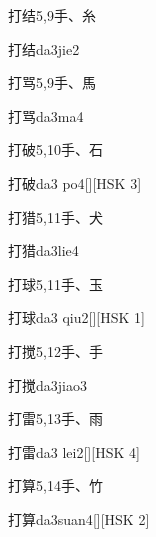 \begin{entry}{打结}{5,9}{⼿、⽷}
  \begin{phonetics}{打结}{da3jie2}
  \end{phonetics}
\end{entry}

\begin{entry}{打骂}{5,9}{⼿、⾺}
  \begin{phonetics}{打骂}{da3ma4}
  \end{phonetics}
\end{entry}

\begin{entry}{打破}{5,10}{⼿、⽯}
  \begin{phonetics}{打破}{da3 po4}[][HSK 3]
  \end{phonetics}
\end{entry}

\begin{entry}{打猎}{5,11}{⼿、⽝}
  \begin{phonetics}{打猎}{da3lie4}
  \end{phonetics}
\end{entry}

\begin{entry}{打球}{5,11}{⼿、⽟}
  \begin{phonetics}{打球}{da3 qiu2}[][HSK 1]
  \end{phonetics}
\end{entry}

\begin{entry}{打搅}{5,12}{⼿、⼿}
  \begin{phonetics}{打搅}{da3jiao3}
  \end{phonetics}
\end{entry}

\begin{entry}{打雷}{5,13}{⼿、⾬}
  \begin{phonetics}{打雷}{da3 lei2}[][HSK 4]
  \end{phonetics}
\end{entry}

\begin{entry}{打算}{5,14}{⼿、⽵}
  \begin{phonetics}{打算}{da3suan4}[][HSK 2]
  \end{phonetics}
\end{entry}

